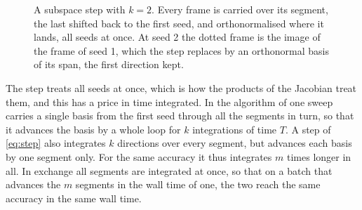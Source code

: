 \documentclass[11pt,a4paper]{article}
\begin{document}
\begin{figure}
  \centering
  \caption{A subspace step with $k = 2$. Every frame is carried over its segment, the last shifted
  back to the first seed, and orthonormalised where it lands, all seeds at once. At seed 2 the
  dotted frame is the image of the frame of seed 1, which the step replaces by an orthonormal
  basis of its span, the first direction kept.}
  \label{fig:subspace}
\end{figure}

The step treats all seeds at once, which is how the products of the Jacobian treat them, and this
has a price in time integrated. In the algorithm of \citet[algorithm 6.2]{lust1997} one sweep
carries a single basis from the first seed through all the segments in turn, so that it advances
the basis by a whole loop for $k$ integrations of time $T$. A step of \eqref{eq:step} also
integrates $k$ directions over every segment, but advances each basis by one segment only. For
the same accuracy it thus integrates $m$ times longer in all. In exchange all segments are
integrated at once, so that on a batch that advances the $m$ segments in the wall time of one,
the two reach the same accuracy in the same wall time.
\end{document}
